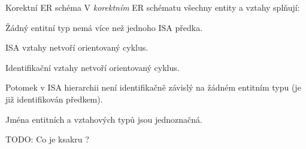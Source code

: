 \begin{obecne}{Korektní ER schéma}
V \emph{korektním} ER schématu všechny entity a vztahy splňují:
\begin{pitemize}
    \item Žádný entitní typ nemá více než jednoho ISA předka.
    \item ISA vztahy netvoří orientovaný cyklus.
    \item Identifikační vztahy netvoří orientovaný cyklus.
    \item Potomek v ISA hierarchii není identifikačně závislý na žádném entitním typu (je již identifikován předkem).
    \item Jména entitních a vztahových typů jsou jednoznačná.
\end{pitemize}
\end{obecne}


TODO: Co je ksakru ?
